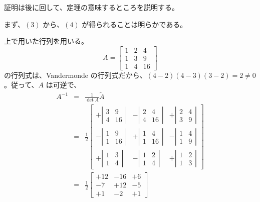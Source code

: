 証明は後に回して、定理の意味するところを説明する。

\smallskip
まず、$(3)$ から、$(4)$ が得られることは明らかである。

上で用いた行列を用いる。
$$A = \left[\begin{array}{ccc}1 & 2 & 4\\ 1 & 3 & 9\\ 1 & 4 & 16 \end{array}\right]$$
の行列式は、Vandermonde の行列式だから、$(4-2)(4-3)(3-2) = 2\neq 0$。従って、$A$ は可逆で、
\begin{eqnarray*}
A^{-1} & = & \frac{1}{\det A}\widetilde{A} \\
& = & \frac{1}{2}\left[\begin{array}{ccc}
+ \left|\begin{array}{cc} 3 & 9\\ 4 & 16 \end{array}\right|  &
- \left|\begin{array}{cc} 2 & 4\\ 4 & 16 \end{array}\right| &
+ \left|\begin{array}{cc} 2 & 4\\ 3 & 9 \end{array}\right| \\
- \left|\begin{array}{cc} 1 & 9\\ 1 & 16 \end{array}\right| &
+ \left|\begin{array}{cc} 1 & 4\\ 1 & 16 \end{array}\right| &
- \left|\begin{array}{cc} 1 & 4\\ 1 & 9 \end{array}\right| \\
+ \left|\begin{array}{cc} 1 & 3\\ 1 & 4 \end{array}\right| &
- \left|\begin{array}{cc} 1 & 2\\ 1 & 4 \end{array}\right| &
+ \left|\begin{array}{cc} 1 & 2\\ 1 & 3 \end{array}\right|
\end{array}\right]\\
& = & \frac12 \left[\begin{array}{ccc}
+ 12  &- 16 &+ 6\\
- 7 &+ 12 &- 5\\
+ 1 &- 2&+ 1
\end{array}\right]
\end{eqnarray*}

